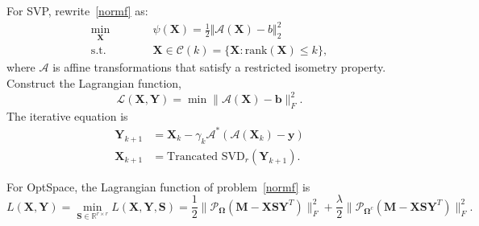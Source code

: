 \documentclass[fontset=windows]{article}
\begin{document}
{For SVP, rewrite~\eqref{normf} as:
\begin{equation}
    \begin{aligned}
        \min_{\mathbf X}\qquad&\quad \psi (\mathbf X) = \frac{1}{2}\Vert \mathcal{A}(\mathbf X) - b\Vert_2^2\\
        \text{s.t.}\qquad&\quad\mathbf X \in \mathcal{C}(k) = \{\mathbf X \colon \text{rank}(\mathbf X) \leq k\},
    \end{aligned}
\end{equation}
where $\mathcal{A}$ is affine transformations that satisfy a restricted isometry property.
Construct the Lagrangian function,
\begin{equation}
    \mathcal{L}(\mathbf X,\mathbf Y) = \min \lVert \mathcal{A}(\mathbf X) -\mathbf b \rVert_F^2.
\end{equation}
The iterative equation is
\begin{equation}
    \begin{aligned}
        \mathbf Y_{k+1} & = \mathbf X_{k} - \gamma_k \mathcal{A}^*(\mathcal{A}(\mathbf X_k)-\mathbf y)\\
        \mathbf X_{k+1} & = \text{Trancated SVD}_r(\mathbf Y_{k+1}).
    \end{aligned}
\end{equation}

For OptSpace, the Lagrangian function of problem~\eqref{normf} is
\begin{equation}
    L(\mathbf X,\mathbf Y) = \min_{\mathbf S\in\mathbb R^{r\times r}} L(\mathbf X,\mathbf Y,\mathbf S) = \frac{1}{2}\lVert\mathcal P_{\mathbf\Omega}(\mathbf M-\mathbf X\mathbf S\mathbf Y^T)\rVert^2_F + \frac{\lambda}{2}\lVert\mathcal P_{\mathbf\Omega^c}(\mathbf M-\mathbf X\mathbf S\mathbf Y^T)
\rVert^2_F.
\end{equation}



}
\end{document}
